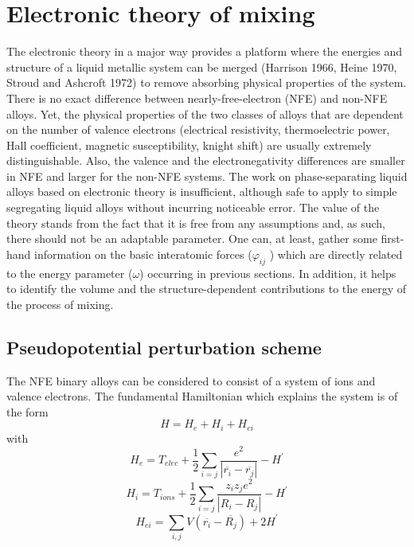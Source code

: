 \documentclass[12pt]{article}
\newcommand*{\1}{\hspace{1pt}}
\begin{document}
    \section{ Electronic theory of mixing }

        The electronic theory in a major way provides a platform where the energies and structure of
    a liquid metallic system can be merged (Harrison 1966, Heine 1970, Stroud and Ashcroft
    1972) to remove absorbing physical properties of the system. 
    There is no exact difference between nearly-free-electron (NFE) and non-NFE alloys. Yet, the 
    physical properties of the two classes of alloys that are dependent on the number of valence 
    electrons (electrical resistivity, thermoelectric power, Hall coefficient, magnetic 
    susceptibility, knight shift) are usually extremely distinguishable. Also, the valence and 
    the electronegativity differences are smaller in NFE and larger for the non-NFE systems.
    The work on phase-separating liquid alloys based on electronic theory is insufficient,
    although safe to apply to simple segregating liquid alloys without incurring noticeable error. 
    The value of the theory stands from the fact that it is free from any assumptions
    and, as such, there should not be an adaptable parameter. One can, at least, gather some
    first-hand information on the basic interatomic forces ($\varphi  _{ij}$ ) which are directly related to the
    energy parameter ($\omega $) occurring in previous sections. In addition, it helps to identify 
    the volume and the structure-dependent contributions to the energy of the process of mixing.\\

    \subsection{ Pseudopotential perturbation scheme}

    The NFE binary alloys can be considered to consist of a system of ions and valence electrons.
    The fundamental Hamiltonian which explains the system is of the form\\

        \begin{equation}
            H = H_e + H_i + H_{ei}
        \end{equation}
    with
        \begin{equation}
            H_e = T _{elec} + \frac{1}{2}\sum_{i = j}^{} \frac{e^2}{|\overline{r_i} - \overline{r_j}|} - H^{\prime }  
        \end{equation}
        \begin{equation}
            H_i = T_{ions} +\frac{1}{2}\sum_{i = j}^{} \frac{z_{i}z_{j}e^2}{|{R_i} - {R_j}|} - H^{\prime }  
        \end{equation}
        \begin{equation}
            H_{ei} = \sum_{i , j}^{} {V(\overline{r_i} - \overline{R_j})} + 2H^{\prime }  
        \end{equation}
\end{document}
